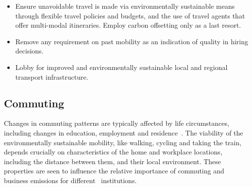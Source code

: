 \documentclass[../SustainableHEP.tex]{subfiles}
\begin{document}
\begin{reco2}{\currentname}
{\begin{itemize}[leftmargin=6 mm]
\item Ensure unavoidable travel is made via environmentally sustainable means through flexible travel policies and budgets, and the use of travel agents that offer multi-modal itineraries.  Employ carbon offsetting only as a last resort.

\item Remove any requirement on past mobility as an indication of quality in hiring decisions. 

\item Lobby for improved and environmentally sustainable local and regional transport infrastructure.

\end{itemize}
}
\end{reco2}
\subsection{Commuting}

Changes in commuting patterns are typically affected by life circumstances, including changes in education, employment and residence~\cite{BEIGE2017179}.  The viability of the environmentally sustainable mobility, like walking, cycling and taking the train, depends crucially on characteristics of the home and workplace locations, including the distance between them, and their local environment. These properties are seen to influence the relative importance of commuting and business emissions for different \ACR\ institutions. 
\end{document}
